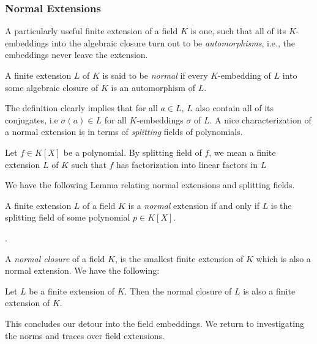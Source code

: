 \documentclass[11pt]{article}
\begin{document}
\subsubsection{Normal Extensions}\label{subsubsec:normal-extensions}
A particularly useful finite extension of a field $K$ is one, such that all of its $K$-embeddings into the algebraic closure turn out
to be {\em automorphisms}, i.e., the embeddings never leave the extension.
\begin{definition}\label{defn:normal-extension}
A finite extension $L$ of $K$ is said to be {\em normal} if every $K$-embedding of $L$ into some algebraic closure of $K$ is an automorphism
of $L$.
\end{definition}
The definition clearly implies that for all $a\in L$, $L$ also contain all of its conjugates, i.e $\sigma(a)\in L$ for all $K$-embeddings $\sigma$
of $L$. A nice characterization of a normal extension is in terms of {\em splitting} fields of polynomials.

\begin{definition}\label{defn:splitting-field}
Let $f\in K[X]$ be a polynomial. By splitting field of $f$, we mean a finite extension $L$ of $K$ such that $f$ has factorization into linear factors
in $L$
\end{definition}

We have the following Lemma relating normal extensions and splitting fields.
\begin{lemma}\label{lem:normal-extn-splitting-fields}
A finite extension $L$ of a field $K$ is a {\em normal} extension if and only if $L$ is the splitting field of some polynomial $p\in K[X]$.
\end{lemma}.

A {\em normal closure} of a field $K$, is the smallest finite extension of $K$ which is also a normal extension.
We have the following:
\begin{lemma}\label{lem:normal-closure}
Let $L$ be a finite extension of $K$. Then the normal closure of $L$ is also a finite extension of $K$.
\end{lemma}

This concludes our detour into the field embeddings.
We return to investigating the norms and traces over field extensions.
\end{document}
